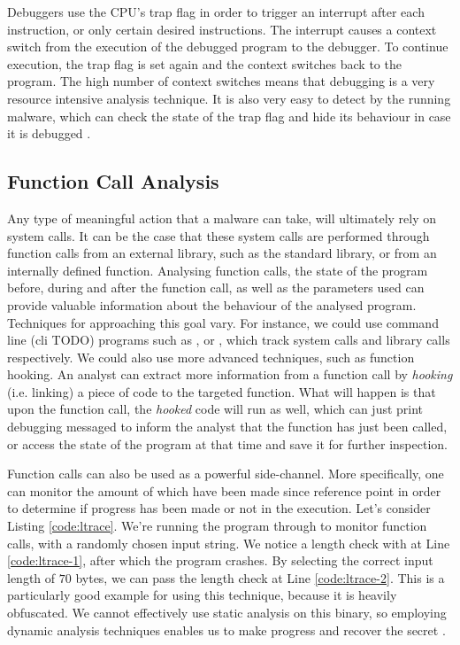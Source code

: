 Debuggers use the CPU's trap flag in order to trigger an interrupt after each instruction, or only certain desired instructions. The interrupt causes a context switch from the execution of the debugged program to the debugger. To continue execution, the trap flag is set again and the context switches back to the program. The high number of context switches means that debugging is a very resource intensive analysis technique. It is also very easy to detect by the running malware, which can check the state of the trap flag and hide its behaviour in case it is debugged \cite{da_survey_2019}.

\subsection{Function Call Analysis}


Any type of meaningful action that a malware can take, will ultimately rely on system calls. It can be the case that these system calls are performed through function calls from an external library, such as the standard  library, or from an internally defined function. Analysing function calls, the state of the program before, during and after the function call, as well as the parameters used can provide valuable information about the behaviour of the analysed program. Techniques for approaching this goal vary. For instance, we could use command line (cli TODO) programs such as , or , which track system calls and library calls respectively. We could also use more advanced techniques, such as function hooking. An analyst can extract more information from a function call by \emph{hooking} (i.e. linking) a piece of code to the targeted function. What will happen is that upon the function call, the \emph{hooked} code will run as well, which can just print debugging messaged to inform the analyst that the function has just been called, or access the state of the program at that time and save it for further inspection. \cite{da_survey_2019}

Function calls can also be used as a powerful side-channel. More specifically, one can monitor the amount of  which have been made since reference point in order to determine if progress has been made or not in the execution. Let's consider Listing \ref{code:ltrace}. We're running the  program through  to monitor function calls, with a randomly chosen input string. We notice a length check with  at Line \ref{code:ltrace-1}, after which the program crashes. By selecting the correct input length of $70$ bytes, we can pass the length check at Line \ref{code:ltrace-2}. This  is a particularly good example for using this technique, because it is heavily obfuscated. We cannot effectively use static analysis on this binary, so employing dynamic analysis techniques enables us to make progress and recover the secret \cite{crusu_relabs}.

